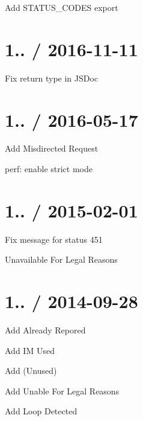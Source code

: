 
\begin{DoxyItemize}
\item Add {\ttfamily S\+T\+A\+T\+U\+S\+\_\+\+C\+O\+D\+ES} export
\end{DoxyItemize}

\section*{1.. / 2016-\/11-\/11 }


\begin{DoxyItemize}
\item Fix return type in J\+S\+Doc
\end{DoxyItemize}

\section*{1.. / 2016-\/05-\/17 }


\begin{DoxyItemize}
\item Add { Misdirected Request}
\item perf\+: enable strict mode
\end{DoxyItemize}

\section*{1.. / 2015-\/02-\/01 }


\begin{DoxyItemize}
\item Fix message for status 451
\begin{DoxyItemize}
\item { Unavailable For Legal Reasons}
\end{DoxyItemize}
\end{DoxyItemize}

\section*{1.. / 2014-\/09-\/28 }


\begin{DoxyItemize}
\item Add { Already Repored}
\item Add { IM Used}
\item Add { (Unused)}
\item Add { Unable For Legal Reasons}
\item Add { Loop Detected}
\end{DoxyItemize}

